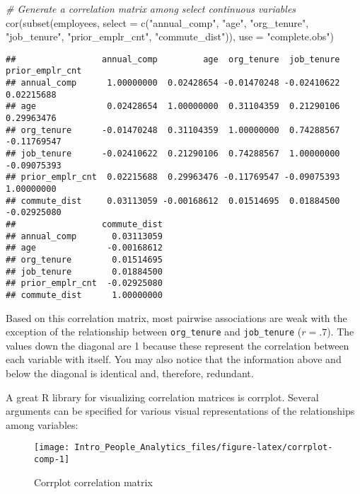 \documentclass[
]{book}
\newenvironment{Shaded}{\begin{snugshade}}{\end{snugshade}}
\newcommand{\AttributeTok}[1]{\textcolor[rgb]{0.77,0.63,0.00}{#1}}
\newcommand{\CommentTok}[1]{\textcolor[rgb]{0.56,0.35,0.01}{\textit{#1}}}
\newcommand{\FunctionTok}[1]{\textcolor[rgb]{0.00,0.00,0.00}{#1}}
\newcommand{\NormalTok}[1]{#1}
\newcommand{\StringTok}[1]{\textcolor[rgb]{0.31,0.60,0.02}{#1}}
\begin{document}
\begin{Shaded}
\begin{Highlighting}[]
\CommentTok{\# Generate a correlation matrix among select continuous variables}
\FunctionTok{cor}\NormalTok{(}\FunctionTok{subset}\NormalTok{(employees, }\AttributeTok{select =} \FunctionTok{c}\NormalTok{(}\StringTok{"annual\_comp"}\NormalTok{, }\StringTok{"age"}\NormalTok{, }\StringTok{"org\_tenure"}\NormalTok{, }\StringTok{"job\_tenure"}\NormalTok{, }\StringTok{"prior\_emplr\_cnt"}\NormalTok{, }\StringTok{"commute\_dist"}\NormalTok{)), }\AttributeTok{use =} \StringTok{"complete.obs"}\NormalTok{)}
\end{Highlighting}
\end{Shaded}

\begin{verbatim}
##                 annual_comp         age  org_tenure  job_tenure prior_emplr_cnt
## annual_comp      1.00000000  0.02428654 -0.01470248 -0.02410622      0.02215688
## age              0.02428654  1.00000000  0.31104359  0.21290106      0.29963476
## org_tenure      -0.01470248  0.31104359  1.00000000  0.74288567     -0.11769547
## job_tenure      -0.02410622  0.21290106  0.74288567  1.00000000     -0.09075393
## prior_emplr_cnt  0.02215688  0.29963476 -0.11769547 -0.09075393      1.00000000
## commute_dist     0.03113059 -0.00168612  0.01514695  0.01884500     -0.02925080
##                 commute_dist
## annual_comp       0.03113059
## age              -0.00168612
## org_tenure        0.01514695
## job_tenure        0.01884500
## prior_emplr_cnt  -0.02925080
## commute_dist      1.00000000
\end{verbatim}

Based on this correlation matrix, most pairwise associations are weak with the exception of the relationship between \texttt{org\_tenure} and \texttt{job\_tenure} (\(r = .7\)). The values down the diagonal are 1 because these represent the correlation between each variable with itself. You may also notice that the information above and below the diagonal is identical and, therefore, redundant.

A great R library for visualizing correlation matrices is corrplot. Several arguments can be specified for various visual representations of the relationships among variables:

\begin{figure}

{\centering \texttt{[image: Intro\_People\_Analytics\_files/figure-latex/corrplot-comp-1]} 

}

\caption{Corrplot correlation matrix}\label{fig:corrplot-comp}
\end{figure}
\end{document}
